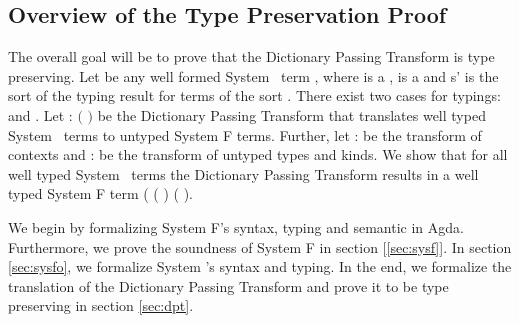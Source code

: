 \subsection{Overview of the Type Preservation Proof}
The overall goal will be to prove that the Dictionary Passing Transform is type preserving. Let  be any well formed System \Fo\ term    \Constr{:} , where  is a  ,  is a   and s' is the sort of the typing result for terms of the sort . There exist two cases for typings:    \Constr{:}  and    \Constr{:} . Let  : $($   \Constr{:} $)$    be the Dictionary Passing Transform that translates well typed System \Fo\ terms to untyped System F terms. Further, let  :    be the transform of contexts and  :      be the transform of untyped types and kinds. We show that for all well typed System \Fo\  terms  the Dictionary Passing Transform results in a well typed System F term (   ( ) \Constr{:} ( ). 

\noindent We begin by formalizing System F's syntax, typing and semantic in Agda. Furthermore, we prove the soundness of System F in section [\ref{sec:sysf}]. In section \ref{sec:sysfo}, we formalize System \Fo's syntax and typing. In the end, we formalize the translation of the Dictionary Passing Transform and prove it to be type preserving in section \ref{sec:dpt}.